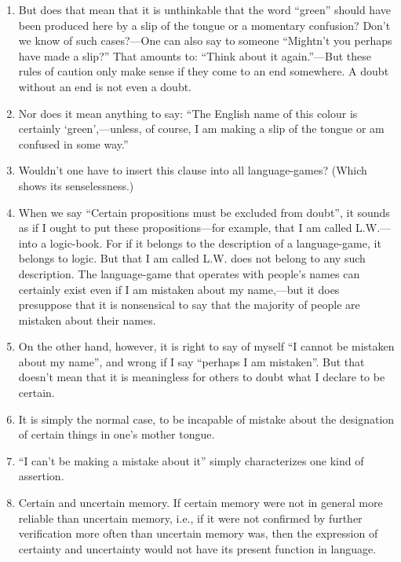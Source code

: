 \documentclass{book}
\begin{document}
\begin{enumerate}
\item
But does that mean that it is unthinkable that the word ``green'' should have
been produced here by a slip of the tongue or a momentary confusion? Don't we
know of such cases?---One can also say to someone ``Mightn't you perhaps have
made a slip?'' That amounts to: ``Think about it again.''---But these rules of
caution only make sense if they come to an end somewhere.  A doubt without an
end is not even a doubt.

\item
Nor does it mean anything to say: ``The English name of this colour is
certainly `green',---unless, of course, I am making a slip of the tongue or am
confused in some way.''

\item
Wouldn't one have to insert this clause into all language-games? (Which shows
its senselessness.)

\item
When we say ``Certain propositions must be excluded from doubt'', it sounds as
if I ought to put these propositions---for example, that I am called
L.W.---into a logic-book. For if it belongs to the description of a
language-game, it belongs to logic. But that I am called L.W. does not belong
to any such description. The language-game that operates with people's names
can certainly exist even if I am mistaken about my name,---but it does
presuppose that it is nonsensical to say that the majority of people are
mistaken about their names.

\item
On the other hand, however, it is right to say of myself ``I cannot be mistaken
about my name'', and wrong if I say ``perhaps I am mistaken''. But that doesn't
mean that it is meaningless for others to doubt what I declare to be certain.

\item
It is simply the normal case, to be incapable of mistake about the designation
of certain things in one's mother tongue.

\item
``I can't be making a mistake about it'' simply characterizes one kind of
assertion.

\item
Certain and uncertain memory. If certain memory were not in general more
reliable than uncertain memory, i.e., if it were not confirmed by further
verification more often than uncertain memory was, then the expression of
certainty and uncertainty would not have its present function in language.


\end{enumerate}
\end{document}
